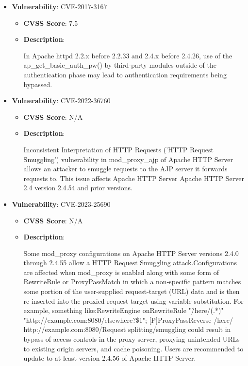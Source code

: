 \documentclass{article}
\begin{document}
\begin{itemize}
        \item \textbf{Vulnerability}: CVE-2017-3167
        \begin{itemize}
            \item \textbf{CVSS Score}:  7.5 
            \item \textbf{Description}:
            \parbox[t]{0.9\linewidth}{
                \ttfamily In Apache httpd 2.2.x before 2.2.33 and 2.4.x before 2.4.26, use of the ap\_get\_basic\_auth\_pw() by third-party modules outside of the authentication phase may lead to authentication requirements being bypassed.
            }
        \end{itemize}
    
        \item \textbf{Vulnerability}: CVE-2022-36760
        \begin{itemize}
            \item \textbf{CVSS Score}:  N/A 
            \item \textbf{Description}:
            \parbox[t]{0.9\linewidth}{
                \ttfamily Inconsistent Interpretation of HTTP Requests ('HTTP Request Smuggling') vulnerability in mod\_proxy\_ajp of Apache HTTP Server allows an attacker to smuggle requests to the AJP server it forwards requests to.  This issue affects Apache HTTP Server Apache HTTP Server 2.4 version 2.4.54 and prior versions.
            }
        \end{itemize}
    
        \item \textbf{Vulnerability}: CVE-2023-25690
        \begin{itemize}
            \item \textbf{CVSS Score}:  N/A 
            \item \textbf{Description}:
            \parbox[t]{0.9\linewidth}{
                \ttfamily Some mod\_proxy configurations on Apache HTTP Server versions 2.4.0 through 2.4.55 allow a HTTP Request Smuggling attack.Configurations are affected when mod\_proxy is enabled along with some form of RewriteRule or ProxyPassMatch in which a non-specific pattern matches some portion of the user-supplied request-target (URL) data and is then re-inserted into the proxied request-target using variable substitution. For example, something like:RewriteEngine onRewriteRule "\^/here/(.*)" "http://example.com:8080/elsewhere?\$1"; [P]ProxyPassReverse /here/ http://example.com:8080/Request splitting/smuggling could result in bypass of access controls in the proxy server, proxying unintended URLs to existing origin servers, and cache poisoning. Users are recommended to update to at least version 2.4.56 of Apache HTTP Server.
            }
        \end{itemize}
    

\end{itemize}
\end{document}
